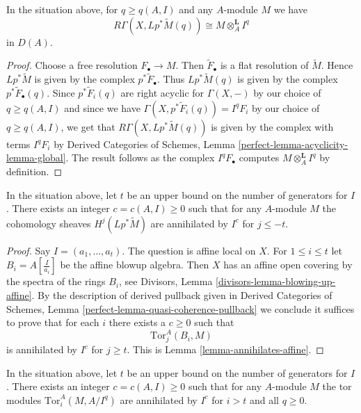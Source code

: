 \begin{lemma}
\label{lemma-compute-tor-Iq}
In the situation above, for $q \geq q(A, I)$ and any $A$-module $M$ we have
$$
R\Gamma(X, Lp^*\widetilde{M}(q)) \cong M \otimes_A^\mathbf{L} I^q
$$
in $D(A)$.
\end{lemma}

\begin{proof}
Choose a free resolution $F_\bullet \to M$. Then $\widetilde{F}_\bullet$
is a flat resolution of $\widetilde{M}$. Hence $Lp^*\widetilde{M}$
is given by the complex $p^*\widetilde{F}_\bullet$. Thus
$Lp^*\widetilde{M}(q)$ is given by the complex $p^*\widetilde{F}_\bullet(q)$.
Since $p^*\widetilde{F}_i(q)$ are right acyclic for $\Gamma(X, -)$ by
our choice of $q \geq q(A, I)$ and since we have
$\Gamma(X, p^*\widetilde{F}_i(q)) = I^qF_i$ by our choice of $q \geq q(A, I)$,
we get that $R\Gamma(X, Lp^*\widetilde{M}(q))$ is given by the complex
with terms $I^qF_i$ by Derived Categories of Schemes, Lemma
\ref{perfect-lemma-acyclicity-lemma-global}.
The result follows as the complex $I^qF_\bullet$ computes
$M \otimes_A^\mathbf{L} I^q$ by definition.
\end{proof}

\begin{lemma}
\label{lemma-annihilates}
In the situation above, let $t$ be an upper bound on the number of
generators for $I$. There exists an integer $c = c(A, I) \geq 0$
such that for any $A$-module $M$ the cohomology sheaves
$H^j(Lp^*\widetilde{M})$ are annihilated by $I^c$ for $j \leq -t$.
\end{lemma}

\begin{proof}
Say $I = (a_1, \ldots, a_t)$. The question is affine local on $X$.
For $1 \leq i \leq t$ let $B_i = A[\frac{I}{a_i}]$ be the affine
blowup algebra. Then $X$ has an affine open covering by
the spectra of the rings $B_i$, see
Divisors, Lemma \ref{divisors-lemma-blowing-up-affine}.
By the description of derived pullback given in
Derived Categories of Schemes, Lemma
\ref{perfect-lemma-quasi-coherence-pullback}
we conclude it suffices to prove that for each $i$ there exists a $c \geq 0$
such that
$$
\text{Tor}_j^A(B_i, M)
$$
is annihilated by $I^c$ for $j \geq t$. This is
Lemma \ref{lemma-annihilates-affine}.
\end{proof}

\begin{lemma}
\label{lemma-annihilates-tors}
In the situation above, let $t$ be an upper bound on the number of
generators for $I$. There exists an integer $c = c(A, I) \geq 0$
such that for any $A$-module $M$ the tor modules
$\text{Tor}_i^A(M, A/I^q)$ are annihilated by $I^c$ for $i > t$
and all $q \geq 0$.
\end{lemma}

